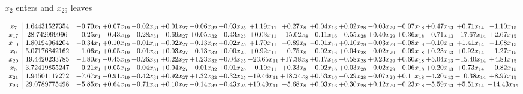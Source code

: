 \documentclass[9pt]{article}
\begin{document}
 $ x_{2} $ enters and $ x_{29} $ leaves 

 \[\begin{array}{c| c c@{\hskip 2pt} c@{\hskip 2pt} c@{\hskip 2pt} c@{\hskip 2pt} c@{\hskip 2pt} c@{\hskip 2pt} c@{\hskip 2pt} c@{\hskip 2pt} c@{\hskip 2pt} c@{\hskip 2pt} c@{\hskip 2pt} c@{\hskip 2pt} c@{\hskip 2pt} c@{\hskip 2pt} c@{\hskip 2pt} }
 x_{7}   &  1.64431527354 & -0.70 x_{1} & +  0.07 x_{19} & -0.02 x_{31} & +  0.01 x_{27} & -0.06 x_{32} & +  0.03 x_{25} & +  1.19 x_{11} & +  0.27 x_{8} & +  0.04 x_{16} & +  0.02 x_{28} & -0.03 x_{29} & -0.07 x_{18} & +  0.47 x_{13} & +  0.71 x_{14} & -1.10 x_{15}\\
 x_{17}   &  28.742999996 & -0.25 x_{1} & -0.43 x_{19} & -0.28 x_{31} & -0.69 x_{27} & +  0.05 x_{32} & -0.43 x_{25} & +  0.03 x_{11} & -15.02 x_{8} & -0.11 x_{16} & -0.55 x_{28} & +  0.40 x_{29} & +  0.36 x_{18} & -0.71 x_{13} & -17.67 x_{14} & +  2.67 x_{15}\\
 x_{10}   &  1.80194964204 & -0.34 x_{1} & +  0.10 x_{19} & -0.01 x_{31} & -0.02 x_{27} & -0.13 x_{32} & +  0.02 x_{25} & +  1.70 x_{11} & -0.89 x_{8} & -0.01 x_{16} & +  0.10 x_{28} & -0.03 x_{29} & -0.08 x_{18} & -0.10 x_{13} & +  1.41 x_{14} & -1.08 x_{15}\\
 x_{9}   &  5.07176842162 & -1.06 x_{1} & +  0.05 x_{19} & -0.01 x_{31} & +  0.03 x_{27} & -0.13 x_{32} & +  0.00 x_{25} & +  0.92 x_{11} & -0.75 x_{8} & -0.02 x_{16} & +  0.04 x_{28} & -0.02 x_{29} & -0.09 x_{18} & +  0.23 x_{13} & +  0.92 x_{14} & -1.27 x_{15}\\
 x_{20}   &  19.4420233785 & -1.80 x_{1} & -0.45 x_{19} & +  0.26 x_{31} & +  0.22 x_{27} & +  1.23 x_{32} & +  0.04 x_{25} & -23.65 x_{11} & + 17.38 x_{8} & +  0.17 x_{16} & -0.58 x_{28} & +  0.23 x_{29} & +  0.60 x_{18} & +  5.04 x_{13} & -15.40 x_{14} & +  4.81 x_{15}\\
 x_{5}   &  3.72419855247 & -0.21 x_{1} & +  0.05 x_{19} & +  0.04 x_{31} & +  0.04 x_{27} & -0.01 x_{32} & +  0.01 x_{25} & -0.19 x_{11} & +  0.33 x_{8} & -0.02 x_{16} & +  0.03 x_{28} & -0.02 x_{29} & -0.06 x_{18} & +  0.20 x_{13} & +  0.73 x_{14} & -0.82 x_{15}\\
 x_{21}   &  1.94501117272 & +  7.67 x_{1} & -0.91 x_{19} & +  0.42 x_{31} & +  0.92 x_{27} & +  1.32 x_{32} & +  0.32 x_{25} & -19.46 x_{11} & + 18.24 x_{8} & +  0.53 x_{16} & -0.29 x_{28} & -0.07 x_{29} & +  0.11 x_{18} & -4.20 x_{13} & -10.38 x_{14} & +  8.97 x_{15}\\
 x_{23}   &  29.0789775498 & -5.85 x_{1} & +  0.64 x_{19} & -0.71 x_{31} & +  0.10 x_{27} & -0.14 x_{32} & -0.43 x_{25} & + 10.49 x_{11} & -5.68 x_{8} & +  0.03 x_{16} & +  0.30 x_{28} & +  0.12 x_{29} & -0.23 x_{18} & -5.59 x_{13} & +  5.51 x_{14} & -14.43 x_{15}\\

\end{array}\]
\end{document}
